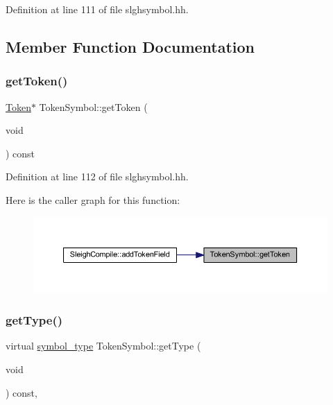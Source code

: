 Definition at line 111 of file slghsymbol.\+hh.



\subsection{Member Function Documentation}
\mbox{\label{class_token_symbol_a96232eae72d636321693f8294b7b9439}} 
\subsubsection{\texorpdfstring{getToken()}{getToken()}}
{\footnotesize\ttfamily \mbox{\hyperlink{class_token}{Token}}$\ast$ Token\+Symbol\+::get\+Token (\begin{DoxyParamCaption}\item[{void}]{ }\end{DoxyParamCaption}) const\hspace{0.3cm}{\ttfamily [inline]}}



Definition at line 112 of file slghsymbol.\+hh.

Here is the caller graph for this function\+:
\nopagebreak
\begin{figure}[H]
\begin{center}
\leavevmode
\includegraphics[width=350pt]{class_token_symbol_a96232eae72d636321693f8294b7b9439_icgraph}
\end{center}
\end{figure}
\mbox{\label{class_token_symbol_a7e8a40307182bedd22dc453c95544247}} 
\subsubsection{\texorpdfstring{getType()}{getType()}}
{\footnotesize\ttfamily virtual \mbox{\hyperlink{class_sleigh_symbol_aba70f7f332fd63488c5ec4bd7807db41}{symbol\+\_\+type}} Token\+Symbol\+::get\+Type (\begin{DoxyParamCaption}\item[{void}]{ }\end{DoxyParamCaption}) const\hspace{0.3cm}{\ttfamily [inline]}, {\ttfamily [virtual]}}



